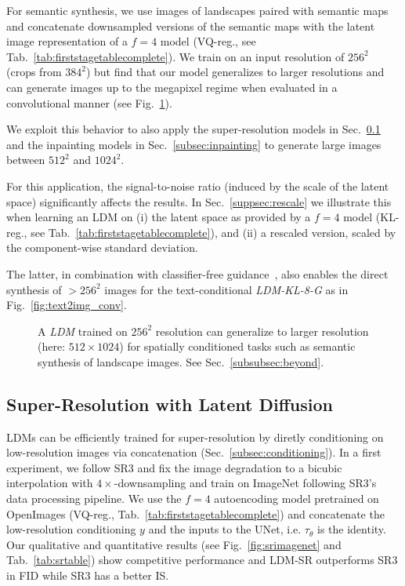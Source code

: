 For semantic synthesis, we use images of landscapes paired with semantic maps \cite{spade, DBLP:journals/corr/abs-2012-09841} and concatenate downsampled versions of the semantic maps with the latent image representation of a $f=4$ model (VQ-reg., see Tab.~\ref{tab:firststagetablecomplete}).
We train on an input resolution of $256^2$ (crops from $384^2$) but find that our model generalizes to larger resolutions and can generate images up to the megapixel regime when evaluated in a convolutional manner (see Fig.~\ref{fig:thicksample}).

We exploit this behavior to also apply the super-resolution models in
Sec.~\ref{subsec:superres} and the inpainting models in
Sec.~\ref{subsec:inpainting} to generate large images between $512^2$ and $1024^2$.

For this application, the signal-to-noise ratio (induced by the scale of the latent space) significantly affects the results. In Sec.~\ref{suppsec:rescale} we illustrate this when learning an LDM on (i) the latent space as provided by a $f=4$ model (KL-reg., see Tab.~\ref{tab:firststagetablecomplete}),
and (ii) a rescaled version, scaled by the component-wise standard deviation. 

The latter, in combination with classifier-free guidance~\cite{ho2021classifier}, also enables the direct synthesis of $>256^2$ images for the text-conditional \emph{LDM-KL-8-G} as in Fig.~\ref{fig:text2img_conv}.

\begin{figure}[htbp]
\centering

  \caption{\label{fig:thicksample} A \emph{LDM} trained on $256^2$ resolution can generalize to 
  larger resolution (here: $512\times1024$) for spatially conditioned tasks
  such as semantic synthesis of landscape images. See
  Sec.~\ref{subsubsec:beyond}.
  }
\end{figure}

\subsection{Super-Resolution with Latent Diffusion}
\label{subsec:superres}

LDMs can be efficiently trained for super-resolution by diretly conditioning on low-resolution images via concatenation (\cf Sec.~\ref{subsec:conditioning}).
In a first experiment, we follow SR3 \cite{DBLP:journals/corr/abs-2104-07636} and fix the image degradation to a bicubic interpolation with $4\times$-downsampling and train on ImageNet following SR3's data processing pipeline. We use the $f=4$ autoencoding model pretrained on OpenImages (VQ-reg., \cf Tab.~\ref{tab:firststagetablecomplete}) and concatenate the low-resolution conditioning $y$ and the inputs to the UNet, i.e. $\tau_\theta$ is the identity. Our qualitative and quantitative results (see Fig.~\ref{fig:srimagenet} and Tab.~\ref{tab:srtable}) show competitive performance and LDM-SR outperforms SR3 in FID while SR3 has a better IS. 

